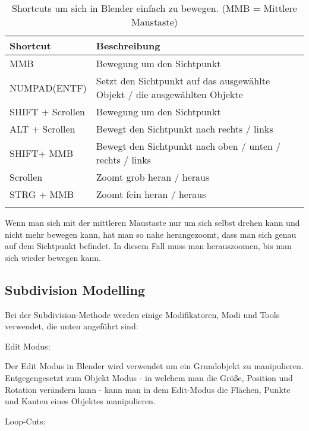 \begin{longtable}{|p{4cm}|p{9.6cm}|}
    \hline
    \endfirsthead
    \textbf{Shortcut} & \textbf{Beschreibung} \\
    \hline
    \endhead

     MMB & Bewegung um den Sichtpunkt \\
     NUMPAD(ENTF) & Setzt den Sichtpunkt auf das ausgewählte Objekt / die ausgewählten Objekte \\
     SHIFT + Scrollen & Bewegung um den Sichtpunkt \\
     ALT + Scrollen & Bewegt den Sichtpunkt nach rechts / links  \\
     SHIFT+ MMB & Bewegt den Sichtpunkt nach oben / unten / rechts / links  \\
     Scrollen & Zoomt grob heran / heraus \\
     STRG + MMB & Zoomt fein heran / heraus  \\
    \hline

    \caption{Shortcuts um sich in Blender einfach zu bewegen. (MMB = Mittlere Maustaste)}
    \label{table:blender_movement}
\end{longtable}

Wenn man sich mit der mittleren Maustaste nur um sich selbst drehen kann und nicht mehr bewegen kann, hat man
so nahe herangezoomt, dass man sich genau auf dem Sichtpunkt befindet. In diesem Fall muss man herauszoomen, bis
man sich wieder bewegen kann.



\subsection{Subdivision Modelling}
\label{sec:subdivision}
Bei der Subdivision-Methode werden einige Modifikatoren, Modi und Tools verwendet, die unten angeführt sind:

Edit Modus\citep{blender:edit_mode}:

Der Edit Modus in Blender wird verwendet um ein Grundobjekt zu manipulieren. Entgegengesetzt zum Objekt Modus - in
welchem man die Größe, Position und Rotation verändern kann - kann man in dem Edit-Modus die Flächen, Punkte und Kanten
eines Objektes manipulieren.

Loop-Cuts\citep{blender:loop_cut_slide}:

